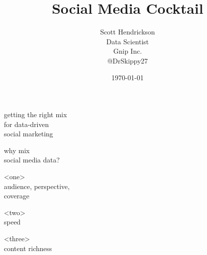 \documentclass{beamer}
\begin{document}
\title{Social Media Cocktail}  
\author{Scott Hendrickson \\ Data Scientist  \\ Gnip Inc.\\ @DrSkippy27}
\date{\today} 


\begin{frame}
\titlepage
\end{frame}


\begin{frame}
\begin{center}
{\Huge getting the right mix \\ [5pt] for data-driven \\ [15pt] social marketing}
\end{center}
\end{frame}

\begin{frame}
\begin{center}
{\Huge why mix \\ [5pt] social media data? }
\end{center}
\end{frame}


\begin{frame}
\begin{center}
{\Huge <one> \\ [5pt]  audience, perspective, \\  [15pt] coverage }
\end{center}
\end{frame}

\begin{frame}
\begin{center}
{\Huge <two> \\ [10pt] speed }
\end{center}
\end{frame}

\begin{frame}
\begin{center}
{\Huge <three> \\ [10pt] content richness }
\end{center}
\end{frame}

%
\end{document}
